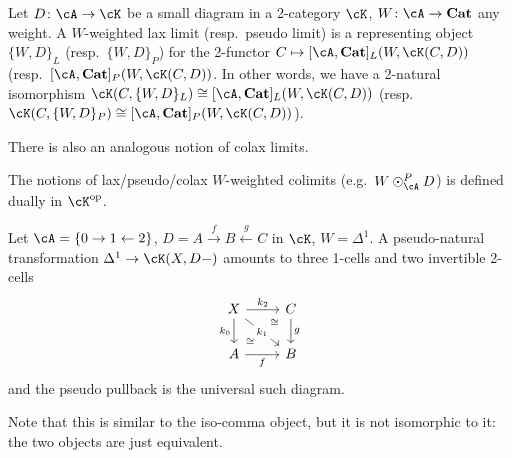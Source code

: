 \documentclass[a4paper,11pt,oneside,openany]{scrbook}
\begin{document}
\begin{defn}
    Let $D\colon\cA\rightarrow\cK$ be a small diagram in a 2-category $\cK$,
    $W\colon\cA\rightarrow\Cat$ any weight. A $W$-weighted lax limit (resp.\
    pseudo limit) is a representing object $\{W,D\}_L$ (resp.\ $\{W,D\}_P$) for
    the 2-functor $C\mapsto [\cA,\Cat]_L(W,\cK(C,D))$ (resp.\
    $[\cA,\Cat]_P(W,\cK(C,D))$. In other words, we have a 2-natural isomorphism
    $\cK(C,\{W,D\}_L)\cong[\cA,\Cat]_L(W,\cK(C,D))$ (resp.\
    $\cK(C,\{W,D\}_P)\cong[\cA,\Cat]_P(W,\cK(C,D))$).

    There is also an analogous notion of colax limits.

    The notions of lax/pseudo/colax $W$-weighted colimits (e.g.\
    $W\odot^P_\cA D$) is defined dually in $\cK^{\op}$.
\end{defn}

\begin{exmp}
    Let $\cA=\{0\rightarrow 1\leftarrow 2\}$,
    $D=A\xrightarrow{f}B\xleftarrow{g}C$ in $\cK$, $W=\Delta^1$. A
    pseudo-natural transformation $\Delta^1\rightarrow\cK(X,D-)$ amounts to
    three 1-cells and two invertible 2-cells
    \[\begin{tikzcd}
        X & C \\
        A & B
        \arrow["f"', from=2-1, to=2-2]
        \arrow["g", from=1-2, to=2-2]
        \arrow["{k_2}", from=1-1, to=1-2]
        \arrow["{k_0}"', from=1-1, to=2-1]
        \arrow[""{name=0, anchor=center, inner sep=0}, "{k_1}"{description}, from=1-1, to=2-2]
        \arrow["\cong"{description, pos=0.3}, Rightarrow, draw=none, from=1-2, to=0]
        \arrow["\cong"{description, pos=0.3}, Rightarrow, draw=none, from=2-1, to=0]
    \end{tikzcd}\]
    and the pseudo pullback is the universal such diagram.

    Note that this is similar to the iso-comma object, but it is not isomorphic
    to it: the two objects are just equivalent.
\end{exmp}

\backmatter
\end{document}
